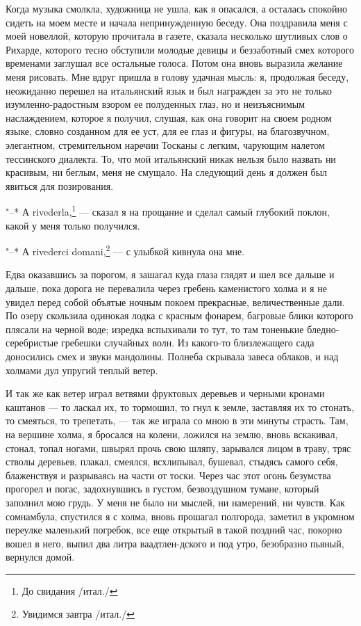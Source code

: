 Когда музыка  смолкла, художница не  ушла, как я опасался,  а осталась
спокойно  сидеть на  моем месте  и начала  непринужденную беседу.  Она
поздравила меня с  моей новеллой, которую прочитала  в газете, сказала
несколько шутливых  слов о  Рихарде, которого тесно  обступили молодые
девицы и  беззаботный смех  которого временами заглушал  все остальные
голоса.  Потом она  вновь выразила  желание меня  рисовать. Мне  вдруг
пришла  в  голову  удачная  мысль:  я,  продолжая  беседу,  неожиданно
перешел  на  итальянский  язык  и  был  награжден  за  это  не  только
изумленно-радостным  взором  ее  полуденных глаз,  но  и  неизъяснимым
наслаждением,  которое я  получил, слушая,  как она  говорит на  своем
родном языке,  словно созданном для ее  уст, для ее глаз  и фигуры, на
благозвучном,  элегантном,  стремительном  наречии Тосканы  с  легким,
чарующим налетом  тессинского диалекта. То, что  мой итальянский никак
нельзя  было назвать  ни  красивым,  ни беглым,  меня  не смущало.  На
следующий день я должен был явиться для позирования.

"--*  А  rivederla,\footnote{До  свидания  /итал./} ---  сказал  я  на
прощание  и  сделал  самый  глубокий   поклон,  какой  у  меня  только
получился.

"--*  А  rivederci  domani,\footnote{Увидимся завтра  /итал./}  ---  с
улыбкой кивнула она мне.

Едва оказавшись  за порогом,  я зашагал  куда глаза  глядят и  шел все
дальше и дальше,  пока дорога не перевалила  через гребень каменистого
холма  и я  не увидел  перед собой  объятые ночным  покоем прекрасные,
величественные  дали.  По озеру  скользила  одинокая  лодка с  красным
фонарем,  багровые  блики которого  плясали  на  черной воде;  изредка
вспыхивали  то  тут,  то  там  тоненькие  бледно-серебристые  гребешки
случайных волн. Из какого-то близлежащего сада доносились смех и звуки
мандолины. Полнеба скрывала завеса облаков,  и над холмами дул упругий
теплый ветер.

И так же как ветер играл  ветвями фруктовых деревьев и черными кронами
каштанов --- то ласкал их, то  тормошил, то гнул к земле, заставляя их
то стонать, то смеяться, то трепетать, --- так же играла со мною в эти
минуты страсть. Там,  на вершине холма, я бросался  на колени, ложился
на землю,  вновь вскакивал,  стонал, топал  ногами, швырял  прочь свою
шляпу, зарывался лицом в траву, тряс стволы деревьев, плакал, смеялся,
всхлипывал, бушевал, стыдясь самого  себя, блаженствуя и разрываясь на
части  от тоски.  Через час  этот  огонь безумства  прогорел и  погас,
задохнувшись  в  густом,  безвоздушном тумане,  который  заполнил  мою
грудь.  У  меня не  было  ни  мыслей,  ни  намерений, ни  чувств.  Как
сомнамбула, спустился я  с холма, вновь прошагал  полгорода, заметил в
укромном переулке маленький погребок, все еще открытый в такой поздний
час, покорно вошел в него, выпил два литра ваадтлен-дского и под утро,
безобразно пьяный, вернулся домой.

